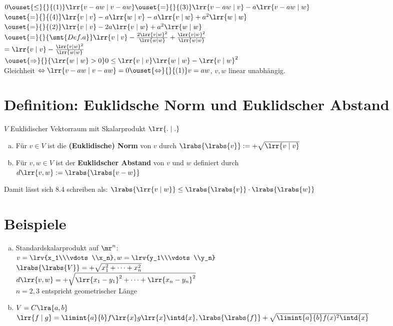 	$0\ouset{\leq}{}{(1)}\lrr{v-aw\mid v-aw}\ouset{=}{}{(3)}\lrr{v-aw\mid v}-a\lrr{v-aw\mid w}$\\
	$\ouset{=}{}{(4)}\lrr{v\mid v}-a\lrr{w\mid v}-a\lrr{v\mid w}+a^2\lrr{w\mid w}$\\
	$\ouset{=}{}{(2)}\lrr{v\mid v}-2a\lrr{v\mid w}+a^2\lrr{w\mid w}$\\
	$\ouset{=}{}{\smt{Def. a}}\lrr{v\mid v}-\frac{2\lrr{v\mid w}^2}{\lrr{w\mid w}}+\frac{\lrr{v\mid w}^2}{\lrr{w\mid w}}$\\
	$=\lrr{v\mid v}-\frac{\lrr{v\mid w}^2}{\lrr{w\mid w}}$\\
	$\ouset{\Rightarrow}{}{\lrr{w\mid w}>0} 0\leq\lrr{v\mid v}\lrr{w\mid w}-\lrr{v\mid w}^2$\\
	Gleichheit $\Leftrightarrow\lrr{v-aw\mid v-aw}=0\ouset{\Leftrightarrow}{}{(1)}v=aw$, $v,w$ linear unabhängig.

\section{Definition: Euklidsche Norm und Euklidscher Abstand}
	$V$ Euklidischer Vektorraum mit Skalarprodukt $\lrr{.\mid .}$
	\begin{enumerate}[a)]
		\item Für $v\in V$ ist die \textbf{(Euklidische) Norm} von $v$ durch $\lrabs{\lrabs{v}}:=+\sqrt{\lrr{v\mid v}}$
		\item Für $v,w\in V$ ist der \textbf{Euklidscher Abstand} von $v$ und $w$ definiert durch\\
			$d\lrr{v,w}:=\lrabs{\lrabs{v-w}}$
	\end{enumerate}
	Damit lässt sich 8.4 schreiben als: $\lrabs{\lrr{v\mid w}}\leq\lrabs{\lrabs{v}}\cdot\lrabs{\lrabs{w}}$

\section{Beispiele}
	\begin{enumerate}[a)]
		\item Standardskalarprodukt auf $\mr^n$:\\
			$v=\lrv{x_1\\\vdots\\x_n}, w=\lrv{y_1\\\vdots\\y_n}$\\
			$\lrabs{\lrabs{V}}=+\sqrt{x_1^2+\dots+x_n^2}$\\
			$d\lrr{v,w}=+\sqrt{\lrr{x_1-y_1}^2+\dots+\lrr{x_n-y_n}^2}$\\
			$n=2,3$ entspricht geometrischer Länge
		\item $V=C\lra{a,b}$\\
			$\lrr{f\mid g}=\limint{a}{b}f\lrr{x}g\lrr{x}\intd{x}, \lrabs{\lrabs{f}}+\sqrt{\limint{a}{b}f(x)^2\intd{x}}$
	\end{enumerate}


